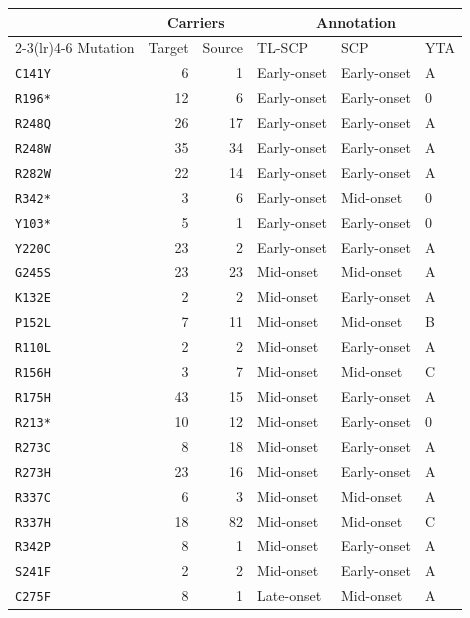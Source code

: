 \begingroup
\fontsize{9.5}{11.4}\selectfont
\renewcommand{\arraystretch}{1}
\setlength{\tabcolsep}{6pt}
\begin{tabular*}{0.98\textwidth}{@{\extracolsep{\fill}}lrrlll@{}}
\toprule
& \multicolumn{2}{c}{Carriers} & \multicolumn{3}{c}{Annotation} \\
\cmidrule(lr){2-3}\cmidrule(lr){4-6}
Mutation & Target & Source & TL-SCP & SCP & YTA \\
\midrule
\texttt{C141Y} & 6 & 1 & Early-onset & Early-onset & A \\
\texttt{R196*} & 12 & 6 & Early-onset & Early-onset & 0 \\
\texttt{R248Q} & 26 & 17 & Early-onset & Early-onset & A \\
\texttt{R248W} & 35 & 34 & Early-onset & Early-onset & A \\
\texttt{R282W} & 22 & 14 & Early-onset & Early-onset & A \\
\texttt{R342*} & 3 & 6 & Early-onset & Mid-onset & 0 \\
\texttt{Y103*} & 5 & 1 & Early-onset & Early-onset & 0 \\
\texttt{Y220C} & 23 & 2 & Early-onset & Early-onset & A \\
\addlinespace[2pt]
\texttt{G245S} & 23 & 23 & Mid-onset & Mid-onset & A \\
\texttt{K132E} & 2 & 2 & Mid-onset & Early-onset & A \\
\texttt{P152L} & 7 & 11 & Mid-onset & Mid-onset & B \\
\texttt{R110L} & 2 & 2 & Mid-onset & Early-onset & A \\
\texttt{R156H} & 3 & 7 & Mid-onset & Mid-onset & C \\
\texttt{R175H} & 43 & 15 & Mid-onset & Early-onset & A \\
\texttt{R213*} & 10 & 12 & Mid-onset & Early-onset & 0 \\
\texttt{R273C} & 8 & 18 & Mid-onset & Early-onset & A \\
\texttt{R273H} & 23 & 16 & Mid-onset & Early-onset & A \\
\texttt{R337C} & 6 & 3 & Mid-onset & Mid-onset & A \\
\texttt{R337H} & 18 & 82 & Mid-onset & Mid-onset & C \\
\texttt{R342P} & 8 & 1 & Mid-onset & Early-onset & A \\
\texttt{S241F} & 2 & 2 & Mid-onset & Early-onset & A \\
\addlinespace[2pt]
\texttt{C275F} & 8 & 1 & Late-onset & Mid-onset & A \\

\end{tabular*}
